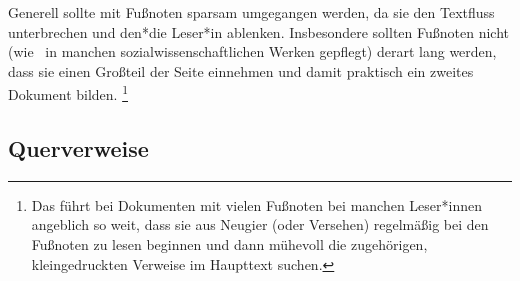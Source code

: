Generell sollte mit Fußnoten sparsam umgegangen werden, da sie den Textfluss
unterbrechen und den*die Leser*in ablenken. Insbesondere sollten Fußnoten
nicht (wie \va\ in manchen sozialwissenschaftlichen Werken gepflegt) derart
lang werden, dass sie einen Großteil der Seite einnehmen und damit praktisch
ein zweites Dokument bilden.%
\footnote{Das führt bei Dokumenten mit vielen Fußnoten bei manchen
Leser*innen angeblich so weit, dass sie aus Neugier (oder Versehen)
    regelmäßig bei den Fußnoten zu lesen beginnen und dann mühevoll die
    zugehörigen, kleingedruckten Verweise im Haupttext suchen.}

\subsection{Querverweise}
\label{sec:querverweise}

